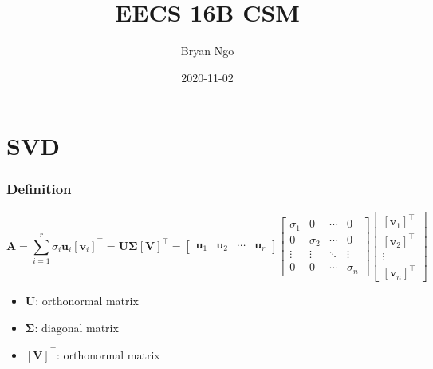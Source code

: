\documentclass[aspectratio=169]{beamer}
\title{EECS 16B CSM}
\author{Bryan Ngo}
\date{2020-11-02}
\institute{UC Berkeley}
\newcommand{\tpose}[1]{\left[#1\right]^{\! \top} \!\!}
\begin{document}
\begin{frame}
    \maketitle
\end{frame}

\section{SVD}

\begin{frame}
    \frametitle{Definition}

    \begin{equation}
        \bm{A} = \sum_{i = 1}^r \sigma_i \bm{u}_i \tpose{\bm{v}_i} = \bm{U \Sigma} \tpose{\bm{V}} =
        \begin{bmatrix}
            \bm{u}_1 & \bm{u}_2 & \cdots & \bm{u}_r
        \end{bmatrix}
        \begin{bmatrix}
            \sigma_1 & 0 & \cdots & 0 \\
            0 & \sigma_2 & \cdots & 0 \\
            \vdots & \vdots & \ddots & \vdots \\
            0 & 0 & \cdots & \sigma_n
        \end{bmatrix}
        \begin{bmatrix}
            \tpose{\bm{v}_1} \\
            \tpose{\bm{v}_2} \\
            \vdots \\
            \tpose{\bm{v}_n}
        \end{bmatrix}
    \end{equation}
    \begin{itemize}
        \item \(\bm{U}\): orthonormal matrix
        \item \(\bm{\Sigma}\): diagonal matrix
        \item \(\tpose{\bm{V}}\): orthonormal matrix
    \end{itemize}
\end{frame}
\end{document}
